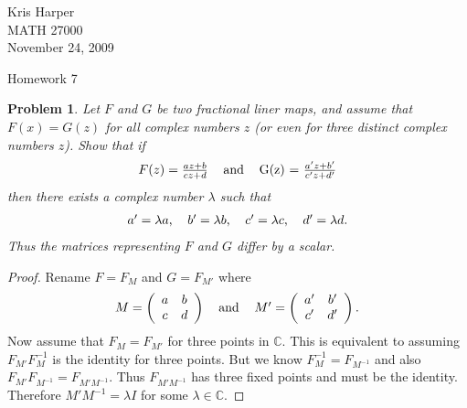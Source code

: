 \documentclass{article}
\newtheorem{problem}{Problem}
\begin{document}
\begin{flushright}
Kris Harper\\

MATH 27000\\

November 24, 2009
\end{flushright}

\begin{center}
Homework 7
\end{center}

\begin{problem}
Let $F$ and $G$ be two fractional liner maps, and assume that $F(x) = G(z)$ for all complex numbers $z$ (or even for three distinct complex numbers $z$). Show that if
\[
\begin{tabular}{ccc}
$F(z) = \frac{az+b}{cz+d}$ & and & G(z) = $\frac{a'z+b'}{c'z+d'}$
\end{tabular}
\]
then there exists a complex number $\lambda$ such that
\[
\begin{tabular}{cccc}
$a' = \lambda a$, & $b' = \lambda b$, & $c' = \lambda c$, & $d' = \lambda d$.
\end{tabular}
\]
Thus the matrices representing $F$ and $G$ differ by a scalar.
\end{problem}
\begin{proof}
Rename $F = F_M$ and $G = F_{M'}$ where
\[
\begin{tabular}{ccc}
$M=
\left (
\begin{array}{cc}
a & b\\
c & d
\end{array}
\right )
$
&
and
&
$
M'=
\left (
\begin{array}{cc}
a' & b'\\
c' & d'
\end{array}
\right ).
$
\end{tabular}
\]
Now assume that $F_M = F_{M'}$ for three points in $\mathbb{C}$. This is equivalent to assuming $F_{M'} F_M^{-1}$ is the identity for three points. But we know $F_M^{-1} = F_{M^{-1}}$ and also $F_{M'} F_{M^{-1}} = F_{M' M^{-1}}$. Thus $F_{M' M^{-1}}$ has three fixed points and must be the identity. Therefore $M'M^{-1} = \lambda I$ for some $\lambda \in \mathbb{C}$.
\end{proof}
\end{document}
